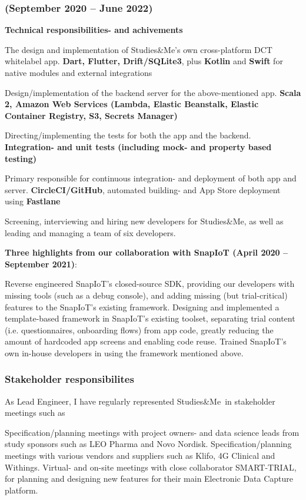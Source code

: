 \documentclass[10pt, a4paper]{article}
\newcommand{\sme}{Studies\&Me}
\begin{document}
\subsubsection*{{\normalfont(September 2020 -- June 2022)}}
\textbf{Technical responsibilities- and achivements}
\begin{outline}
  \1 The design and implementation of \sme's own cross-platform DCT whitelabel app.\newline
    {\footnotesize \textbf{Dart, Flutter, Drift/SQLite3}, plus \textbf{Kotlin} and \textbf{Swift} for native modules and external integrations}

  \1 Design/implementation of the backend server for the above-mentioned app.\newline
  {\footnotesize \textbf{Scala 2, Amazon Web Services (Lambda, Elastic Beanstalk, Elastic Container Registry, S3, Secrets Manager)}}

  \1 Directing/implementing the tests for both the app and the backend.\newline
    {\footnotesize \textbf{Integration- and unit tests (including mock- and property based testing)}}

  \1 Primary responsible for continuous integration- and deployment of both app and server.\newline
    {\footnotesize \textbf{CircleCI/GitHub}, automated building- and App Store deployment using \textbf{Fastlane}}

  \1 Screening, interviewing and hiring new developers for \sme, as well as leading and managing a team of six developers.
\end{outline}

\textbf{Three highlights from our collaboration with SnapIoT (April 2020 -- September 2021)}:
\begin{outline}
  \1 Reverse engineered SnapIoT's closed-source SDK, providing our developers with missing tools (such as a debug console), and adding missing (but trial-critical) features to the SnapIoT's existing framework.
  \1 Designing and implemented a template-based framework in SnapIoT's existing toolset, separating trial content (i.e. questionnaires, onboarding flows) from app code, greatly reducing the amount of hardcoded app screens and enabling code reuse.
  \1 Trained SnapIoT's own in-house developers in using the framework mentioned above.
\end{outline}

\subsubsection*{Stakeholder responsibilites}
As Lead Engineer, I have regularly represented \sme\ in stakeholder meetings such as 
\begin{outline}
  \1 Specification/planning meetings with project owners- and data science leads from study sponsors such as LEO Pharma and Novo Nordisk.
  \1 Specification/planning meetings with various vendors and suppliers such as Klifo, 4G Clinical and Withings.
  \1 Virtual- and on-site meetings with close collaborator SMART-TRIAL, for planning and designing new features for their main Electronic Data Capture platform.
\end{outline}
\end{document}

